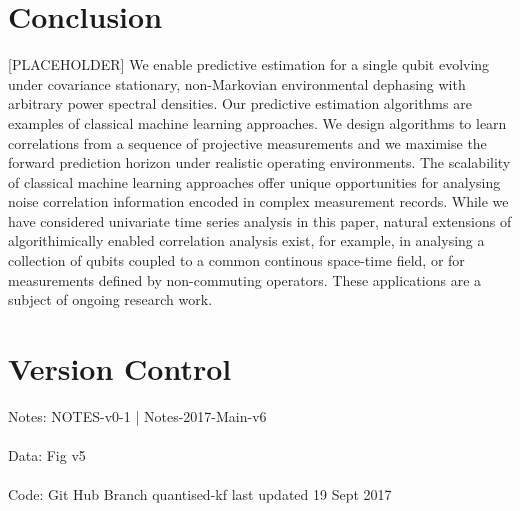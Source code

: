 \section{Conclusion \label{sec:main:Conclusion}}
[PLACEHOLDER]
We enable predictive estimation for a single qubit evolving under covariance stationary, non-Markovian environmental dephasing with arbitrary power spectral densities. Our predictive estimation algorithms are examples of classical machine learning approaches. We  design algorithms to learn correlations from a sequence of projective measurements and we maximise the forward prediction horizon under realistic operating environments. The scalability of classical machine learning approaches offer unique opportunities for analysing noise correlation information encoded in complex measurement records. While we have considered univariate time series analysis in this paper, natural extensions of algorithimically enabled correlation analysis exist, for example, in analysing a collection of qubits coupled to a common continous space-time field, or for measurements defined by non-commuting operators. These applications are a subject of ongoing research work.

\section{Version Control \label{sec:main:versioncontrol}}
Notes: NOTES-v0-1 | Notes-2017-Main-v6
\\
\\
Data: Fig v5
\\
\\
Code: Git Hub Branch quantised-kf last updated 19 Sept 2017
\\
\\